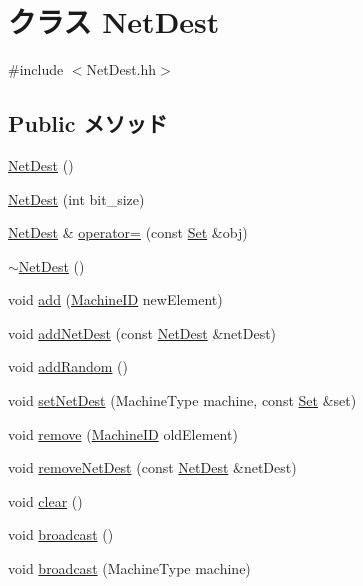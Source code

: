 \hypertarget{classNetDest}{
\section{クラス NetDest}
\label{classNetDest}
}


{\ttfamily \#include $<$NetDest.hh$>$}\subsection*{Public メソッド}
\begin{DoxyCompactItemize}
\item 
\hyperlink{classNetDest_a4ecec6e900f50203df05a785b5b88e1c}{NetDest} ()
\item 
\hyperlink{classNetDest_aeaef8a119d3eb01b0a0c0492079eb21b}{NetDest} (int bit\_\-size)
\item 
\hyperlink{classNetDest}{NetDest} \& \hyperlink{classNetDest_a25dd337795dbd5ae36a4c7f5f1f45f8d}{operator=} (const \hyperlink{classSet}{Set} \&obj)
\item 
\hyperlink{classNetDest_a0152f2294384fa9f28bbbd134abc6201}{$\sim$NetDest} ()
\item 
void \hyperlink{classNetDest_afbaba944e1b52530702aad09dd563a79}{add} (\hyperlink{structMachineID}{MachineID} newElement)
\item 
void \hyperlink{classNetDest_a894c4ecd8db74ee23ec331048c9665bc}{addNetDest} (const \hyperlink{classNetDest}{NetDest} \&netDest)
\item 
void \hyperlink{classNetDest_abd48774eca8e19eb2371c41bdf73c93c}{addRandom} ()
\item 
void \hyperlink{classNetDest_a5c762cca91b20b0ef2912214cbebf301}{setNetDest} (MachineType machine, const \hyperlink{classSet}{Set} \&set)
\item 
void \hyperlink{classNetDest_a716c5d07d7bdfb2be2a8882083362ae3}{remove} (\hyperlink{structMachineID}{MachineID} oldElement)
\item 
void \hyperlink{classNetDest_af6e6cf2f93ba297eb841f1518f3bbb7a}{removeNetDest} (const \hyperlink{classNetDest}{NetDest} \&netDest)
\item 
void \hyperlink{classNetDest_ac8bb3912a3ce86b15842e79d0b421204}{clear} ()
\item 
void \hyperlink{classNetDest_a299d89c50484c4d3a597f6b43b65e21c}{broadcast} ()
\item 
void \hyperlink{classNetDest_a32f4d06bc79cf19c91c4866f25abe500}{broadcast} (MachineType machine)
\item 

\end{DoxyCompactItemize}
